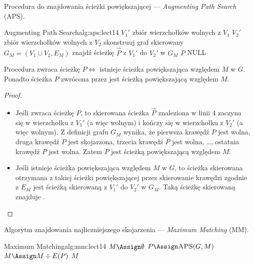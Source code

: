Procedura do znajdowania ścieżki powiększającej --- \textit{Augmenting Path Search} (APS).

\begin{alg}{Augmenting Path Search}{alg:aps:lect14}
	 
	\State $V_1'$ \Assign zbiór wierzchołków wolnych z $V_1$
	\State $V_2'$ \Assign zbiór wierzchołków wolnych z $V_2$
	\State skonstruuj graf skierowany $G_M = (V_1 \cup V_2, E_M)$
	\State znajdź ścieżkę $\vec{P}$ z $V_1'$ do $V_2'$ w $G_M$
	\State \Return $P$ 
	\Else
	\State \Return NULL
	\EndIf
	\EndFunction
\end{alg}

\begin{lemma}
	Procedura \textnormal{} zwraca ścieżkę $P \iff$ istnieje ścieżka powiększająca względem $M$ w $G$. Ponadto ścieżka $P$ zwrócona przez \textnormal{} jest ścieżką powiększającą względem $M$.
\end{lemma}

\begin{proof} ~
	\begin{itemize}
		\item[$\implies$] Jeśli \textnormal{} zwraca ścieżkę $P$, to skierowana ścieżka $\vec{P}$ znaleziona w linii 4 zaczyna się w wierzchołku z $V_1'$ (a więc wolnym) i kończy się w wierzchołku z $V_2'$ (a więc wolnym). Z definicji grafu $G_M$ wynika, że pierwsza krawędź $P$ jest wolna, druga krawędź $P$ jest skojarzona, trzecia krawędź $P$ jest wolna, \dots, ostatnia krawędź $P$ jest wolna. Zatem $P$ jest ścieżką powiększającą względem $M$.

		\item[$\impliedby$] Jeśli istnieje ścieżka powiększająca względem $M$ w $G$, to ścieżka skierowana otrzymana z takiej ścieżki powiększającej przez skierowanie krawędzi zgodnie z $E_M$ jest ścieżką skierowaną z $V_1'$ do $V_2'$ w $G_M$. Taką ścieżkę skierowaną znajduje \textnormal{}.
	\end{itemize}
\end{proof}

Algorytm znajdowania najliczniejszego skojarzenia --- \textit{Maximum Matching} (MM).

\begin{alg}{Maximum Matching}{alg:mm:lect14}
	 
	\State $M \Assign \emptyset$
	\Repeat
	\State $P \Assign \Call{APS}{G, M}$
	\State $M \Assign M \div E(P)$
	\EndIf
	\State \Return $M$
	\EndFunction
\end{alg}

